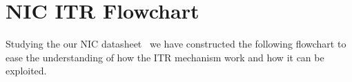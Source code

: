 \newpage
\section{NIC ITR Flowchart}
\label{appendix:itr}
Studying the our NIC datasheet~\cite{82599} we have constructed the following flowchart to ease the understanding of how the ITR mechanism work and how it can be exploited.  


